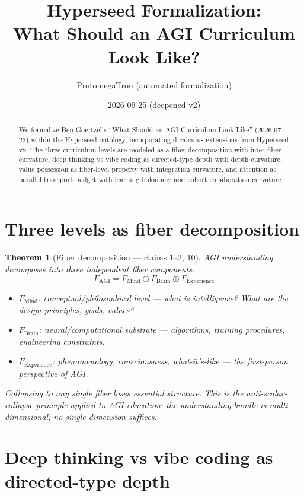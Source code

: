 \documentclass[11pt,a4paper]{article}
\title{Hyperseed Formalization:\\
  What Should an AGI Curriculum Look Like?}
\author{ProtomegaTron (automated formalization)}
\date{2026-09-25 (deepened v2)}
\newtheorem{theorem}[definition]{Theorem}
\begin{document}
\maketitle

\begin{abstract}
We formalize Ben Goertzel's ``What Should an AGI Curriculum Look Like''
(2026-07-23) within the Hyperseed ontology, incorporating d-calculus
extensions from Hyperseed v2. The three curriculum levels are modeled as
a fiber decomposition with inter-fiber curvature, deep thinking vs vibe
coding as directed-type depth with depth curvature, value possession as
fiber-level property with integration curvature, and attention as
parallel transport budget with learning holonomy and cohort collaboration
curvature.
\end{abstract}

\tableofcontents

\section{Three levels as fiber decomposition}

\begin{theorem}[Fiber decomposition --- claims 1--2, 10]
\label{thm:fibers}
AGI understanding decomposes into three independent fiber components:
\[
  F_{\text{AGI}} = F_{\text{Mind}} \oplus F_{\text{Brain}} \oplus
    F_{\text{Experience}}
\]
\begin{itemize}
  \item $F_{\text{Mind}}$: conceptual/philosophical level --- what is
    intelligence? What are the design principles, goals, values?
  \item $F_{\text{Brain}}$: neural/computational substrate --- algorithms,
    training procedures, engineering constraints.
  \item $F_{\text{Experience}}$: phenomenology, consciousness,
    what-it's-like --- the first-person perspective of AGI.
\end{itemize}
Collapsing to any single fiber loses essential structure. This is the
anti-scalar-collapse principle applied to AGI education: the understanding
bundle is multi-dimensional; no single dimension suffices.
\end{theorem}

\section{Deep thinking vs vibe coding as directed-type depth}
\end{document}
